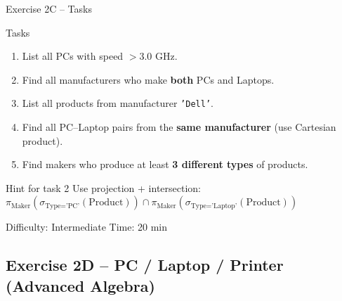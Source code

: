 \documentclass[10pt]{beamer}
\begin{document}
\begin{frame}{Exercise 2C -- Tasks}
  \begin{block}{Tasks}
    \begin{enumerate}
      \item List all PCs with speed $> 3.0$ GHz.
      \item Find all manufacturers who make \textbf{both} PCs and Laptops.
      \item List all products from manufacturer \texttt{'Dell'}.
      \item Find all PC--Laptop pairs from the \textbf{same manufacturer} (use Cartesian product).
      \item Find makers who produce at least \textbf{3 different types} of products.
    \end{enumerate}
  \end{block}

  \begin{block}{Hint for task 2}
    Use projection + intersection:
    $\pi_{\text{Maker}}(\sigma_{\text{Type}=\text{'PC'}}(\text{Product})) \cap \pi_{\text{Maker}}(\sigma_{\text{Type}=\text{'Laptop'}}(\text{Product}))$
  \end{block}

  \begin{alertblock}{Difficulty: Intermediate \quad Time: 20 min}
  \end{alertblock}
\end{frame}

\subsection{Exercise 2D -- PC / Laptop / Printer (Advanced Algebra)}
\end{document}
